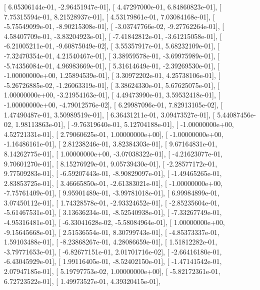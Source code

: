 \documentclass{article}
\begin{document}
       [  6.05306144e-01,  -2.96451947e-01],
       [  4.47297000e-01,   6.84860823e-01],
       [  7.75315594e-01,   8.21528937e-01],
       [  4.53179861e-01,   7.03084168e-01],
       [ -5.75549099e-01,  -8.90215308e-01],
       [ -3.03747766e-02,  -9.27762264e-01],
       [  4.58407709e-01,  -3.83204923e-01],
       [ -7.41842812e-01,  -3.61215058e-01],
       [ -6.21005211e-01,  -9.60875049e-02],
       [  3.55357917e-01,   5.68232109e-01],
       [ -7.32470354e-01,   4.21540467e-01],
       [  3.38959578e-01,  -3.69975989e-01],
       [ -5.74356084e-01,   4.96983669e-01],
       [  5.31614649e-01,  -2.39269530e-01],
       [ -1.00000000e+00,   1.25894539e-01],
       [  3.30972202e-01,   4.25738106e-01],
       [ -5.26726885e-02,  -1.26063319e-01],
       [  3.38624330e-01,   5.67625075e-01],
       [  1.00000000e+00,  -3.21954163e-01],
       [  4.49473990e-01,   3.59532418e-01],
       [ -1.00000000e+00,  -4.79012576e-02],
       [  6.29987096e-01,   7.82913105e-02],
       [  1.47490487e-01,   3.50989519e-01],
       [  6.36431211e-01,   3.09473527e-01],
       [  5.44087456e-02,   1.98113863e-01],
       [ -9.76319640e-01,   5.12704188e-01],
       [ -1.00000000e+00,   4.52721331e-01],
       [  2.79060625e-01,   1.00000000e+00],
       [ -1.00000000e+00,  -1.16486161e-01],
       [  2.81238246e-01,   3.82384303e-01],
       [  9.67164831e-01,   8.14262775e-01],
       [  1.00000000e+00,  -3.07038322e-01],
       [ -4.21623077e-01,   9.70601270e-01],
       [  8.15276929e-01,   9.05739430e-01],
       [ -2.28577172e-01,   9.77509283e-01],
       [ -6.59207443e-01,  -8.90829097e-01],
       [ -1.49465265e-01,   2.83853725e-01],
       [  3.46665850e-01,  -2.61383021e-01],
       [ -1.00000000e+00,  -7.75761409e-01],
       [  9.95901489e-01,  -3.99781018e-01],
       [  6.99984899e-01,   3.07450112e-01],
       [  1.74328578e-01,  -2.93324652e-01],
       [ -2.85235604e-01,  -5.61467531e-01],
       [  3.13636234e-01,  -8.52540938e-01],
       [ -7.33267749e-01,  -4.95316481e-01],
       [ -6.33041628e-02,  -5.58084964e-01],
       [  1.00000000e+00,  -9.15645668e-01],
       [  2.51536554e-01,   8.30799743e-01],
       [ -4.85373337e-01,   1.59103488e-01],
       [ -8.23868267e-01,   4.28086659e-01],
       [  1.51812282e-01,  -3.79771653e-01],
       [ -6.82677151e-01,   2.01701716e-02],
       [ -2.66416180e-01,  -6.43045929e-01],
       [  1.99116405e-01,  -8.52402150e-01],
       [ -1.47141542e-01,   2.07947185e-01],
       [  5.19797753e-02,   1.00000000e+00],
       [ -5.82172361e-01,   6.72723522e-01],
       [  1.49973527e-01,   4.39320415e-01],
\end{document}
